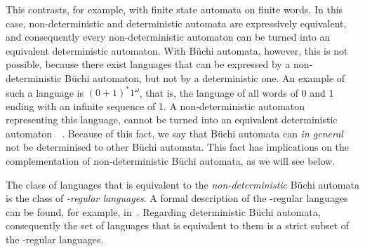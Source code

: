 This contrasts, for example, with finite state automata on finite words. In this case, non-deterministic and deterministic automata are expressively equivalent, and consequently every non-deterministic automaton can be turned into an equivalent deterministic automaton. With Büchi automata, however, this is not possible, because there exist languages that can be expressed by a non-deterministic Büchi automaton, but not by a deterministic one. An example of such a language is $(0+1)^*1^\omega$, that is, the language of all words of 0 and 1 ending with an infinite sequence of 1. A non-deterministic automaton representing this language, cannot be turned into an equivalent deterministic automaton~~\cite{1996_vardi, 2002_roggenbach}. Because of this fact, we say that Büchi automata can \textit{in general} not be determinised to other Büchi automata. This fact has implications on the complementation of non-deterministic Büchi automata, as we will see below.

The class of languages that is equivalent to the \textit{non-deterministic} Büchi automata is the class of \textit{\om-regular languages}. A formal description of the \om-regular languages can be found, for example, in~\cite{Thomas:1991,1996_thomas,2014_wilke}. Regarding deterministic Büchi automata, consequently the set of languages that is equivalent to them is a strict subset of the \om-regular languages.




